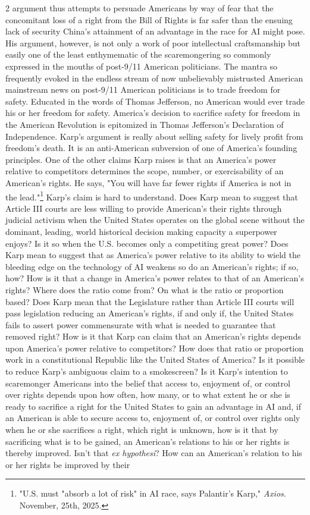 \documentclass[10pt,a4paper,twoside]{article} %
\begin{document}
\begin{multicols}{2}
argument thus attempts to persuade Americans by way of fear that the concomitant loss of a right from the Bill of Rights is far safer than the ensuing lack of security China's attainment of an advantage in the race for AI might pose. His argument, however, is not only a work of poor intellectual craftsmanship but easily one of the least enthymematic of the scaremongering so commonly expressed in the mouths of post-9/11 American politicians. The mantra so frequently evoked in the endless stream of now unbelievably mistrusted American mainstream news on post-9/11 American politicians is to trade freedom for safety. Educated in the words of Thomas Jefferson, no American would ever trade his or her freedom for safety. America's decision to sacrifice safety for freedom in the American Revolution is epitomized in Thomas Jefferson's Declaration of Independence. Karp's argument is really about selling safety for lively profit from freedom's death. It is an anti-American subversion of one of America's founding principles. \newline \indent One of the other claims Karp raises is that an America's power relative to competitors determines the scope, number, or exercisability of an American's rights. He says, "You will have far fewer rights if America is not in the lead."\footnote{"U.S. must "absorb a lot of risk" in AI race, says Palantir's Karp," \emph{Axios}. November, 25th, 2025.} Karp's claim is hard to understand. Does Karp mean to suggest that Article III courts are less willing to provide American's their rights through judicial activism when the United States operates on the global scene without the dominant, leading, world historical decision making capacity a superpower enjoys? Is it so when the U.S. becomes only a competiting great power? Does Karp mean to suggest that as America's power relative to its ability to wield the bleeding edge on the technology of AI weakens so do an American's rights; if so, how? How is it that a change in America's power relates to that of an American's rights? Where does the ratio come from? On what is the ratio or proportion based? Does Karp mean that the Legislature rather than Article III courts will pass legislation reducing an American's rights, if and only if, the United States fails to assert power commensurate with what is needed to guarantee that removed right? How is it that Karp can claim that an American's rights depends upon America's power relative to competitors? How does that ratio or proportion work in a constitutional Republic like the United States of America? Is it possible to reduce Karp's ambiguous claim to a smokescreen? Is it Karp's intention to scaremonger Americans into the belief that access to, enjoyment of, or control over rights depends upon how often, how many, or to what extent he or she is ready to sacrifice a right for the United States to gain an advantage in AI and, if an American is able to secure access to, enjoyment of, or control over rights only when he or she sacrifices a right, which right is unknown, how is it that by sacrificing what is to be gained, an American's relations to his or her rights is thereby improved. Isn't that \emph{ex hypothesi}? How can an American's relation to his or her rights be improved by their 
\end{multicols}
\end{document}
